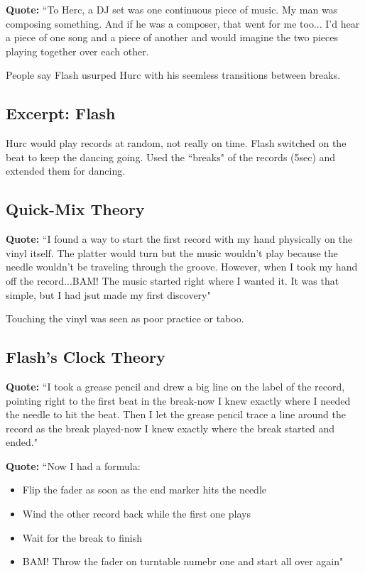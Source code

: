 \documentclass[12pt, a4paper, twoside, openright, titlepage]{book}
\begin{document}
\textbf{Quote:} ``To Herc, a DJ set was one continuous piece of music. My man was composing something. And if he was a composer, that went for me too... I'd hear a piece of one song and a piece of another and would imagine the two pieces playing together over each other.

People say Flash usurped Hurc with his seemless transitions between breaks.

\subsection{Excerpt: Flash}

Hurc would play records at random, not really on time. Flash switched on the beat to keep the dancing going. Used the ``breaks" of the records (5sec) and extended them for dancing.

\subsection{Quick-Mix Theory}

\textbf{Quote:} ``I found a way to start the first record with my hand physically on the vinyl itself. The platter would turn but the music wouldn't play because the needle wouldn't be traveling through the groove. However, when I took my hand off the record...BAM! The music started right where I wanted it. It was that simple, but I had jsut made my first discovery"

Touching the vinyl was seen as poor practice or taboo.

\subsection{Flash's Clock Theory}

\textbf{Quote:} ``I took a grease pencil and drew a big line on the label of the record, pointing right to the first beat in the break-now I knew exactly where I needed the needle to hit the beat. Then I let the grease pencil trace a line around the record as the break played-now I knew exactly where the break started and ended."


\textbf{Quote:} ``Now I had a formula: \begin{itemize}
    \item Flip the fader as soon as the end marker hits the needle
    \item Wind the other record back while the first one plays
    \item Wait for the break to finish
    \item BAM! Throw the fader on turntable numebr one and start all over again"
\end{itemize}
\end{document}
